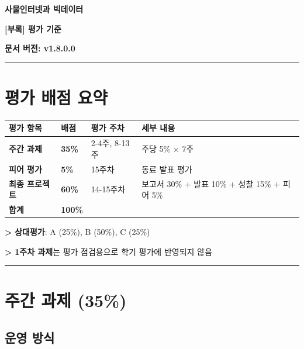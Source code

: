 \documentclass[11pt, a4paper]{article}
\newcommand{\note}[1]{%
    \vspace{3pt}
    \noindent\textcolor{textgray}{\textbf{>} #1}
    \vspace{3pt}
}
\begin{document}
\begin{center}
{\fontsize{24pt}{28pt}\selectfont\bfseries\color{mainblue} 사물인터넷과 빅데이터}

\vspace{8pt}

{\Large\bfseries [부록] 평가 기준}

\vspace{8pt}

{\normalsize\bfseries 문서 버전: v1.8.0.0}
\end{center}

\vspace{5pt}
\noindent\rule{\textwidth}{0.5pt}

\section{평가 배점 요약}

\begin{table}[h]
\centering
\begin{tabular}{|L{4cm}|C{2cm}|C{3cm}|L{4.5cm}|}
\hline
{}
\textbf{평가 항목} & \textbf{배점} & \textbf{평가 주차} & \textbf{세부 내용} \\
\hline
\textbf{주간 과제} & \textbf{35\%} & 2-4주, 8-13주 & 주당 5\% × 7주 \\
\hline
\textbf{피어 평가} & \textbf{5\%} & 15주차 & 동료 발표 평가 \\
\hline
\textbf{최종 프로젝트} & \textbf{60\%} & 14-15주차 & 보고서 30\% + 발표 10\% + 성찰 15\% + 피어 5\% \\
\hline
\textbf{합계} & \textbf{100\%} & & \\
\hline
\end{tabular}
\end{table}

\note{\textbf{상대평가}: A (25\%), B (50\%), C (25\%)}

\note{\textbf{1주차 과제}는 평가 점검용으로 학기 평가에 반영되지 않음}

\vspace{3pt}
\noindent\rule{\textwidth}{0.3pt}

\section{주간 과제 (35\%)}

\subsection{운영 방식}
\end{document}
